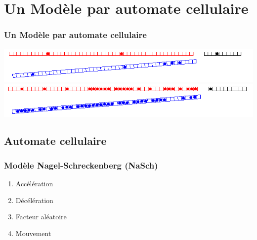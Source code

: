 \documentclass[slidetop,11pt]{beamer}
\begin{document}
\section{Un Modèle par automate cellulaire}
	\begin{frame}
		\frametitle{Un Modèle par automate cellulaire}
		\begin{center}
			\includegraphics[scale=0.42]{./images/localdebut}\vfill
			\includegraphics[scale=0.42]{./images/localsature}
		\end{center}
	\end{frame}

	\subsection{Automate cellulaire}
		\begin{frame}
	\frametitle{Modèle Nagel-Schreckenberg (NaSch)}
	\begin{enumerate}
		\item Accélération 
		\item Décélération
		\item Facteur aléatoire
		\item Mouvement
	\end{enumerate}
\end{frame}
\end{document}
